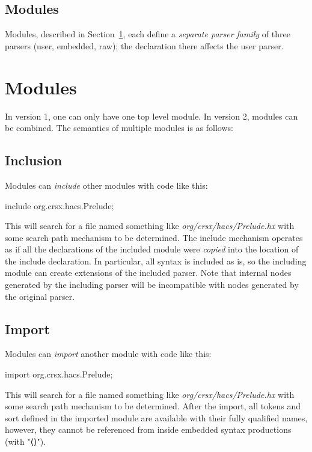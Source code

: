 \documentclass[11pt]{article} %
\begin{document}
\subsection{Modules}

Modules, described in Section~\ref{sec:modules}, each define a \emph{separate parser family} of
three parsers (user, embedded, raw); the  declaration there affects the user parser.


\section{Modules}\label{sec:modules}

In version 1, one can only have one top level module. In version 2, modules can be combined.  The
semantics of multiple modules is as follows:

\subsection{Inclusion}

Modules can \emph{include} other modules with code like this:
\begin{hacs}
    include org.crsx.hacs.Prelude;
\end{hacs}
This will search for a file named something like \emph{org/crsx/hacs/Prelude.hx} with some search
path mechanism to be determined.  The include mechanism operates as if all the declarations of the
included module were \emph{copied} into the location of the include declaration.  In particular,
all syntax is included as is, so the including module can create extensions of the included
parser. Note that internal nodes generated by the including parser will be incompatible with nodes
generated by the original parser.

\subsection{Import}

Modules can \emph{import} another module with code like this:
\begin{hacs}
    import org.crsx.hacs.Prelude;
\end{hacs}
This will search for a file named something like \emph{org/crsx/hacs/Prelude.hx} with some search
path mechanism to be determined.  After the import, all tokens and sort defined in the imported
module are available with their fully qualified names, however, they cannot be referenced from
inside embedded syntax productions (with "⟨⟩").
\end{document}
